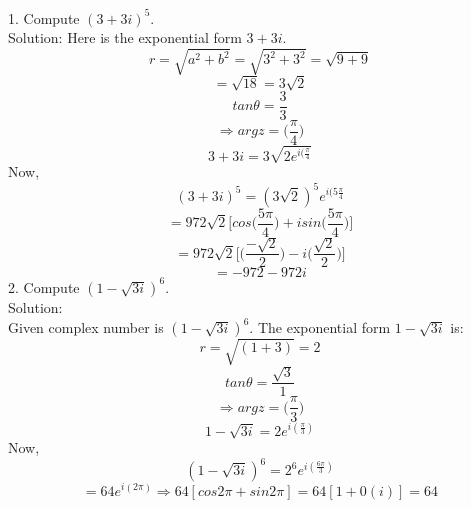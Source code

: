 \documentclass[a4paper, 12pt]{report}
\begin{document}
{1. Compute $(3 + 3i)^5$.\\
Solution:
Here is the exponential form $3 + 3i$.
\begin{equation*}
r = \sqrt{a^2 + b^2} = \sqrt{3^2 + 3^2} = \sqrt{9 + 9}
\end{equation*}
\begin{equation*}
= \sqrt{18} = 3\sqrt{2}
\end{equation*}
\begin{equation*}
tan\theta = \frac{3}{3}
\end{equation*}
\begin{equation*}
\Rightarrow argz = \bigg(\frac{\pi}{4}\bigg)
\end{equation*}
\begin{equation*}
3 + 3i = 3\sqrt{2e^{i(\frac{\pi}{4}}}
\end{equation*}
Now,
\begin{equation*}
(3 + 3i)^5 = (3\sqrt{2})^5e^{i(5\frac{\pi}{4}}
\end{equation*}
\begin{equation*}
= 972\sqrt{2}\bigg[cos\bigg(\frac{5\pi}{4}\bigg) + isin\bigg(\frac{5\pi}{4}\bigg)\bigg]
\end{equation*}
\begin{equation*}
= 972\sqrt{2}\bigg[\bigg(\frac{-\sqrt{2}}{2}\bigg) - i\bigg(\frac{\sqrt{2}}{2}\bigg)\bigg]
\end{equation*}
\begin{equation*}
= -972 - 972i
\end{equation*}
2. Compute $(1- \sqrt{3i})^6$.\\
Solution:\\
Given complex number is $(1 - \sqrt{3i})^6$.
The exponential form $1 - \sqrt{3i}$ is:
\begin{equation*}
r = \sqrt{(1 + 3)} = 2
\end{equation*}
\begin{equation*}
tan\theta = \frac{\sqrt{3}}{1}
\end{equation*}
\begin{equation*}
\Rightarrow arg z = \bigg(\frac{\pi}{3}\bigg)
\end{equation*}
\begin{equation*}
1 - \sqrt{3i} = 2e^{i(\frac{\pi}{3})}
\end{equation*}
Now,
\begin{equation*}
(1 - \sqrt{3i})^6 = 2^6e^{i(\frac{6\pi}{3})}
\end{equation*}
\begin{equation}
= 64e^{i(2\pi)} \Rightarrow 64[cos2\pi + sin2\pi] = 64[1 + 0(i)] = 64

\end{equation}}
\end{document}
